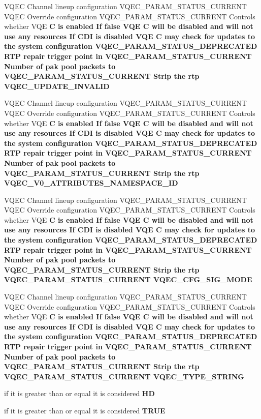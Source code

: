 \begin{CompactItemize}
\item 
VQEC Channel lineup configuration VQEC\_\-PARAM\_\-STATUS\_\-CURRENT VQEC Override configuration VQEC\_\-PARAM\_\-STATUS\_\-CURRENT Controls whether VQE \bf{C} is enabled If false VQE \bf{C} will be disabled and will not use any resources If CDI is disabled VQE \bf{C} may check for updates \bf{to} the system configuration VQEC\_\-PARAM\_\-STATUS\_\-DEPRECATED RTP repair trigger point in VQEC\_\-PARAM\_\-STATUS\_\-CURRENT Number of pak pool packets \bf{to} VQEC\_\-PARAM\_\-STATUS\_\-CURRENT Strip the rtp \bf{VQEC\_\-UPDATE\_\-INVALID}
\item 
VQEC Channel lineup configuration VQEC\_\-PARAM\_\-STATUS\_\-CURRENT VQEC Override configuration VQEC\_\-PARAM\_\-STATUS\_\-CURRENT Controls whether VQE \bf{C} is enabled If false VQE \bf{C} will be disabled and will not use any resources If CDI is disabled VQE \bf{C} may check for updates \bf{to} the system configuration VQEC\_\-PARAM\_\-STATUS\_\-DEPRECATED RTP repair trigger point in VQEC\_\-PARAM\_\-STATUS\_\-CURRENT Number of pak pool packets \bf{to} VQEC\_\-PARAM\_\-STATUS\_\-CURRENT Strip the rtp \bf{VQEC\_\-V0\_\-ATTRIBUTES\_\-NAMESPACE\_\-ID}
\item 
VQEC Channel lineup configuration VQEC\_\-PARAM\_\-STATUS\_\-CURRENT VQEC Override configuration VQEC\_\-PARAM\_\-STATUS\_\-CURRENT Controls whether VQE \bf{C} is enabled If false VQE \bf{C} will be disabled and will not use any resources If CDI is disabled VQE \bf{C} may check for updates \bf{to} the system configuration VQEC\_\-PARAM\_\-STATUS\_\-DEPRECATED RTP repair trigger point in VQEC\_\-PARAM\_\-STATUS\_\-CURRENT Number of pak pool packets \bf{to} VQEC\_\-PARAM\_\-STATUS\_\-CURRENT Strip the rtp VQEC\_\-PARAM\_\-STATUS\_\-CURRENT \bf{VQEC\_\-CFG\_\-SIG\_\-MODE}
\item 
VQEC Channel lineup configuration VQEC\_\-PARAM\_\-STATUS\_\-CURRENT VQEC Override configuration VQEC\_\-PARAM\_\-STATUS\_\-CURRENT Controls whether VQE \bf{C} is enabled If false VQE \bf{C} will be disabled and will not use any resources If CDI is disabled VQE \bf{C} may check for updates \bf{to} the system configuration VQEC\_\-PARAM\_\-STATUS\_\-DEPRECATED RTP repair trigger point in VQEC\_\-PARAM\_\-STATUS\_\-CURRENT Number of pak pool packets \bf{to} VQEC\_\-PARAM\_\-STATUS\_\-CURRENT Strip the rtp VQEC\_\-PARAM\_\-STATUS\_\-CURRENT \bf{VQEC\_\-TYPE\_\-STRING}
\item 
if it is greater than or equal it is considered \bf{HD}
\item 
if it is greater than or equal it is considered \bf{TRUE}

\end{CompactItemize}
